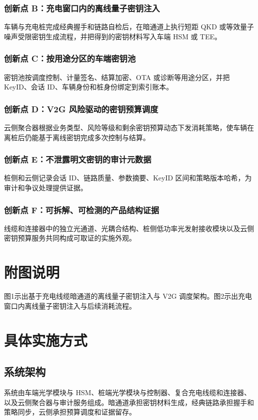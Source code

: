 ﻿\documentclass[12pt,a4paper]{article}
\begin{document}
\subsubsection{创新点 B：充电窗口内的离线量子密钥注入}
车辆与充电桩完成经典握手和链路自检后，在暗通道上执行短距 QKD 或等效量子噪声受限密钥生成流程，并把得到的密钥材料写入车端 HSM 或 TEE。

\subsubsection{创新点 C：按用途分区的车端密钥池}
密钥池按调度控制、计量签名、结算加密、OTA 或诊断等用途分区，并把 KeyID、会话 ID、车辆身份和桩身份绑定到索引账本。

\subsubsection{创新点 D：V2G 风险驱动的密钥预算调度}
云侧聚合器根据业务类型、风险等级和剩余密钥预算动态下发消耗策略，使车辆在离桩后仍能基于离线密钥完成多次控制与结算。

\subsubsection{创新点 E：不泄露明文密钥的审计元数据}
桩侧和云侧记录会话 ID、链路质量、参数摘要、KeyID 区间和策略版本哈希，为审计和争议处理提供证据。

\subsubsection{创新点 F：可拆解、可检测的产品结构证据}
线缆和连接器中的独立光通道、光耦合结构、桩侧低功率光发射接收模块以及云侧密钥预算服务共同构成可取证的实施外观。

\section{附图说明}
图1示出基于充电线缆暗通道的离线量子密钥注入与 V2G 调度架构。图2示出充电窗口内离线量子密钥注入与后续消耗流程。

\section{具体实施方式}
\subsection{系统架构}
系统由车端光学模块与 HSM、桩端光学模块与控制器、复合充电线缆和连接器、以及云侧聚合器与审计服务组成。暗通道承担密钥材料生成，经典链路承担握手和策略同步，云侧承担预算调度和证据留存。
\end{document}
